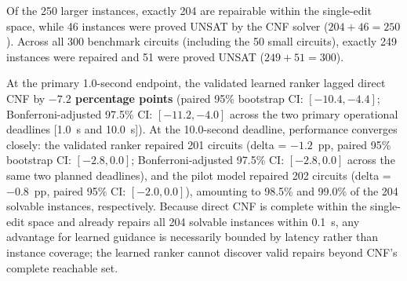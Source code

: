 \documentclass[11pt]{article}
\begin{document}
Of the 250 larger instances, exactly 204 are repairable within the single-edit space, while 46 instances were proved UNSAT by the CNF solver ($204 + 46 = 250$). Across all 300 benchmark circuits (including the 50 small circuits), exactly 249 instances were repaired and 51 were proved UNSAT ($249 + 51 = 300$).

At the primary 1.0-second endpoint, the validated learned ranker lagged direct CNF by \textbf{$-7.2$ percentage points} (paired 95\% bootstrap CI: $[-10.4, -4.4]$; Bonferroni-adjusted 97.5\% CI: $[-11.2, -4.0]$ across the two primary operational deadlines [1.0~s and 10.0~s]). At the 10.0-second deadline, performance converges closely: the validated ranker repaired 201 circuits (delta = $-1.2$~pp, paired 95\% bootstrap CI: $[-2.8, 0.0]$; Bonferroni-adjusted 97.5\% CI: $[-2.8, 0.0]$ across the same two planned deadlines), and the pilot model repaired 202 circuits (delta = $-0.8$~pp, paired 95\% CI: $[-2.0, 0.0]$), amounting to 98.5\% and 99.0\% of the 204 solvable instances, respectively. Because direct CNF is complete within the single-edit space and already repairs all 204 solvable instances within 0.1~s, any advantage for learned guidance is necessarily bounded by latency rather than instance coverage; the learned ranker cannot discover valid repairs beyond CNF's complete reachable set.
\end{document}
